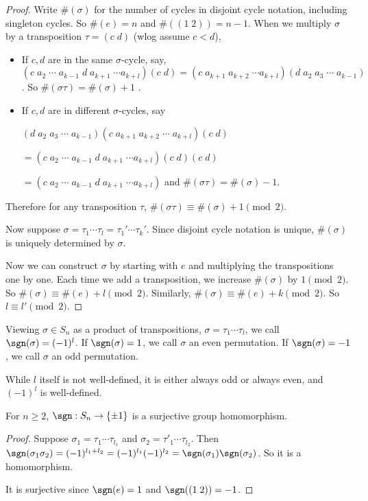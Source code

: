 \documentclass[a4paper]{article}
\begin{document}
  \begin{proof}
    Write $\#(\sigma)$ for the number of cycles in disjoint cycle notation, including singleton cycles. So $\#(e) = n$ and $\#((1\; 2)) = n - 1$. When we multiply $\sigma$ by a transposition $\tau = (c\; d)$ (wlog assume $c < d$),
    \begin{itemize}
      \item If $c, d$ are in the same $\sigma$-cycle, say, $(c\; a_2\; \cdots \; a_{k - 1}\; d\; a_{k + 1}\; \cdots a_{k + l})(c\; d) = (c\; a_{k+1}\; a_{k+2}\;\cdots a_{k + l})(d\; a_2\; a_3\;\cdots\; a_{k - 1})$. So $\#(\sigma\tau) = \#(\sigma) + 1$ .
      \item If $c, d$ are in different $\sigma$-cycles, say

        $(d\; a_2\; a_3\;\cdots\;a_{k - 1})(c\; a_{k + 1}\; a_{k + 2}\;\cdots\; a_{k + l})(c\; d) $

        $=(c\; a_2\; \cdots \; a_{k - 1}\; d\; a_{k + 1}\; \cdots a_{k + l})(c\; d)(c\; d)$

        $= (c\; a_2\; \cdots \; a_{k - 1}\; d\; a_{k + 1}\; \cdots a_{k + l})$ and $\#(\sigma\tau) = \#(\sigma) - 1$.

    \end{itemize}
    Therefore for any transposition $\tau$, $\#(\sigma\tau) \equiv \#(\sigma) + 1 \pmod 2$. 

    Now suppose $\sigma = \tau_1\cdots\tau_l = \tau_1'\cdots\tau_{k}'$. Since disjoint cycle notation is unique, $\#(\sigma)$ is uniquely determined by $\sigma$. 

    Now we can construct $\sigma$ by starting with $e$ and multiplying the transpositions one by one. Each time we add a transposition, we increase $\#(\sigma)$ by $1 \pmod 2$. So $\#(\sigma) \equiv \#(e) + l\pmod 2$. Similarly, $\#(\sigma) \equiv \#(e) + k \pmod 2$. So $l \equiv l' \pmod 2$.
  \end{proof}

  \begin{defi}
    Viewing $\sigma\in S_n$ as a product of transpositions, $\sigma = \tau_1\cdots \tau_l$, we call $\sgn(\sigma) = (-1)^l$. If $\sgn(\sigma) = 1$, we call $\sigma$ an even permutation. If $\sgn(\sigma) = -1$, we call $\sigma$ an odd permutation.
  \end{defi}
  \note While $l$ itself is not well-defined, it is either always odd or always even, and $(-1)^l$ is well-defined.

  \begin{thm}
    For $n\geq 2$, $\sgn : S_n \rightarrow \{\pm 1\}$ is a surjective group homomorphism. 
  \end{thm}
  \begin{proof}
    Suppose $\sigma_1 = \tau_1\cdots \tau_{l_1}$ and $\sigma_2 = \tau'_1\cdots \tau_{l_2}$. Then $\sgn(\sigma_1\sigma_2) = (-1)^{l_1 + l_2} = (-1)^{l_1}(-1)^{l_2} = \sgn(\sigma_1)\sgn(\sigma_2)$. So it is a homomorphism.

    It is surjective since $\sgn(e) = 1$ and $\sgn((1\; 2)) = -1$.
  \end{proof}
\end{document}
